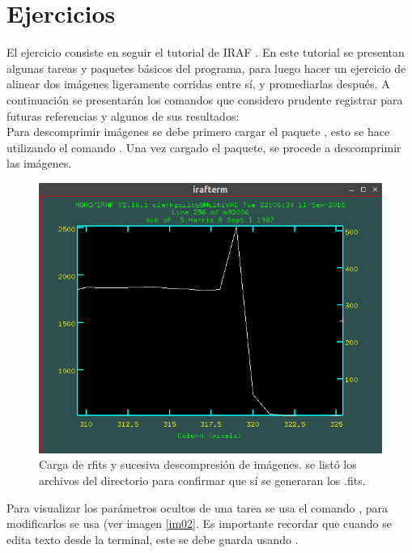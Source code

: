 \documentclass[12pt]{article}
\begin{document}
\section{Ejercicios}
El ejercicio consiste en seguir el tutorial de IRAF . En este tutorial se presentan algunas tareas y paquetes básicos del programa, para luego hacer un ejercicio de alinear dos imágenes ligeramente corridas entre sí, y promediarlas después. A continuación se presentarán los comandos que considero prudente registrar para futuras referencias y algunos de sus resultados:\\
Para descomprimir imágenes se debe primero cargar el paquete , esto se hace utilizando el comando . Una vez cargado el paquete, se procede a descomprimir las imágenes.	

\begin{figure}[H]
  \centering
   \includegraphics[scale= 0.65]{im01.png}
  \caption{Carga de rfits y sucesiva descompresión de imágenes. se listó los archivos del directorio para confirmar que sí se generaran los .fits. }
  \label{im01}
\end{figure}

Para visualizar los parámetros ocultos de una tarea se usa el comando , para modificarlos se usa  (ver imagen \ref{im02}. Es importante recordar que cuando se edita texto desde la terminal, este se debe guarda usando . 
\end{document}
